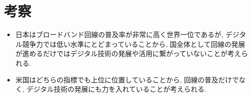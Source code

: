 \documentclass[a4paper,11pt,dvipdfmx]{ujarticle}
\begin{document}
\section{考察}
\begin{itemize}
    \item 日本はブロードバンド回線の普及率が非常に高く世界一位であるが, デジタル競争力では低い水準にとどまっていることから, 国全体として回線の発展が進めるだけではデジタル技術の発展や活用に繋がっていないことが考えられる. 
    \item 米国はどちらの指標でも上位に位置していることから, 回線の普及だけでなく, デジタル技術の発展にも力を入れていることが考えられる.
\end{itemize}
%


\cite{oecd,imd}

\end{document}
